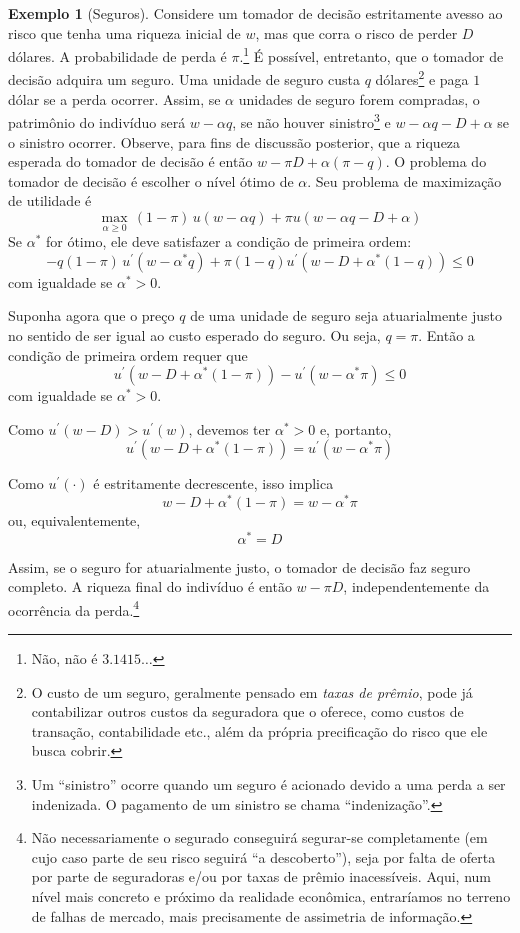 \documentclass[12pt]{article}
\numberwithin{equation}{section}
\theoremstyle{plain}
\theoremstyle{definition}
\newtheorem{example}[theorem]{Exemplo}
\theoremstyle{remark}
\begin{document}
\begin{example}[Seguros]
  \label{exemploseguros}
  \parencite[exemplo 6.C.1]{Mas-Colell1995} Considere um tomador de decisão estritamente avesso ao risco que tenha uma riqueza inicial de \(w\), mas que corra o risco de perder \(D\) dólares. A probabilidade de perda é \(\pi\).\footnote{Não, não é \(3.1415 \dots\)} É possível, entretanto, que o tomador de decisão adquira um seguro. Uma unidade de seguro custa \(q\) dólares\footnote{O custo de um seguro, geralmente pensado em \textit{taxas de prêmio}, pode já contabilizar outros custos da seguradora que o oferece, como custos de transação, contabilidade etc., além da própria precificação do risco que ele busca cobrir.} e paga \(1\) dólar se a perda ocorrer. Assim, se \(\alpha\) unidades de seguro forem compradas, o patrimônio do indivíduo será \(w-\alpha q\), se não houver sinistro\footnote{Um ``sinistro'' ocorre quando um seguro é acionado devido a uma perda a ser indenizada. O pagamento de um sinistro se chama ``indenização''.} e \(w-\alpha q-D+\alpha\) se o sinistro ocorrer. Observe, para fins de discussão posterior, que a riqueza esperada do tomador de decisão é então \(w - \pi D + \alpha (\pi - q)\). O problema do tomador de decisão é escolher o nível ótimo de \(\alpha\). Seu problema de maximização de utilidade é
    \[
      \max\limits_{\alpha \geq 0}  \,(1-\pi) \, u(w-\alpha q) + \pi u(w-\alpha q - D + \alpha )
  \]
  Se \(\alpha^*\) for ótimo, ele deve satisfazer a condição de primeira ordem:
  \[
    -q(1-\pi) \, u^{\prime} (w-\alpha^* q)+ \pi(1-q) u^{\prime} (w-D+\alpha^* (1-q)) \leq 0
  \]
  com igualdade se \(\alpha^* > 0\).
  
  Suponha agora que o preço \(q\) de uma unidade de seguro seja atuarialmente justo no sentido de ser igual ao custo esperado do seguro. Ou seja, \(q=\pi\). Então a condição de primeira ordem requer que
  \[
  u^{\prime} (w-D+\alpha^* (1-\pi))-u^{\prime} (w-\alpha^* \pi) \leq 0
  \]
  com igualdade se \(\alpha^* > 0\).
  
  Como \(u^\prime (w-D) > u^\prime (w)\), devemos ter \(\alpha^*>0\) e, portanto,
  \[
  u^\prime (w-D+\alpha^* (1-\pi))=u^\prime (w-\alpha^* \pi)
  \]
  
  Como \(u^{\prime}  (\cdot)\) é estritamente decrescente, isso implica
  \[
    w-D+\alpha^* (1-\pi)=w-\alpha^* \pi
    \]
    ou, equivalentemente,
    \[
      \alpha^* = D
      \]
      
      Assim, se o seguro for atuarialmente justo, o tomador de decisão faz seguro completo. A riqueza final do indivíduo é então \(w-\pi D\), independentemente da ocorrência da perda.\footnote{Não necessariamente o segurado conseguirá segurar-se completamente (em cujo caso parte de seu risco seguirá ``a descoberto''), seja por falta de oferta por parte de seguradoras e/ou por taxas de prêmio inacessíveis. Aqui, num nível mais concreto e próximo da realidade econômica, entraríamos no terreno de falhas de mercado, mais precisamente de assimetria de informação.
      
}
\end{example}
\end{document}
